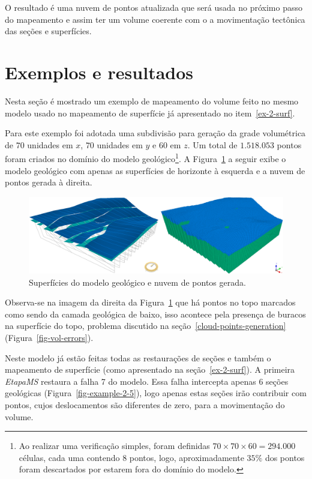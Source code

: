 O resultado é uma nuvem de pontos atualizada que será usada no próximo passo do mapeamento e assim ter um volume coerente com o a movimentação tectônica das seções e superfícies.

\section{Exemplos e resultados}

Nesta seção é mostrado um exemplo de mapeamento do volume feito no mesmo modelo usado no mapeamento de superfície já apresentado no item~\ref{ex-2-surf}.

Para este exemplo foi adotada uma subdivisão para geração da grade volumétrica de $70$ unidades em $x$, $70$ unidades em $y$ e $60$ em $z$. Um total de $1.518.053$ pontos foram criados no domínio do modelo geológico\footnote{Ao realizar uma verificação simples, foram definidas $70\times70\times60=294.000$ células, cada uma contendo $8$ pontos, logo, aproximadamente $35\%$ dos pontos foram descartados por estarem fora do domínio do modelo.}. A Figura~\ref{fig-vol-ex-1} a seguir exibe o modelo geológico com apenas as superfícies de horizonte à esquerda e a nuvem de pontos gerada à direita.

\begin{figure} [H]
  \begin{center}
    \includegraphics[width=\textwidth]{images/fig-vol-ex-1}
    \caption{Superfícies do modelo geológico e nuvem de pontos gerada.}\label{fig-vol-ex-1}
  \end{center}
\end{figure}

Observa-se na imagem da direita da Figura~\ref{fig-vol-ex-1} que há pontos no topo marcados como sendo da camada geológica de baixo, isso acontece pela presença de buracos na superfície do topo, problema discutido na seção~\ref{cloud-points-generation} (Figura~\ref{fig-vol-errors}).

Neste modelo já estão feitas todas as restaurações de seções e também o mapeamento de superfície (como apresentado na seção~\ref{ex-2-surf}). A primeira \emph{EtapaMS} restaura a falha 7 do modelo. Essa falha intercepta apenas 6 seções geológicas (Figura~\ref{fig-example-2-5}), logo apenas estas seções irão contribuir com pontos, cujos deslocamentos são diferentes de zero, para a movimentação do volume. 

